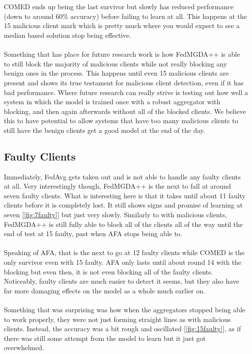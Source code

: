 \\ \\
COMED ends up being the last survivor but slowly has reduced performance (down to around 60\% accuracy) before failing to learn at all.
This happens at the 15 malicious client mark which is pretty much where you would expect to see a median based solution stop being effective.
\\ \\
Something that has place for future research work is how FedMGDA++ is able to still block the majority of malicious clients while not really blocking any benign ones in the process.
This happens until even 15 malicious clients are present and shows its true testament for malicious client detection, even if it has bad performance.
Where future research can really strive is testing out how well a system in which the model is trained once with a robust aggregator with blocking, and then again afterwards without all of the blocked clients.
We believe this to have potential to allow systems that have too many malicious clients to still have the benign clients get a good model at the end of the day.


\subsection{Faulty Clients}
Immediately, FedAvg gets taken out and is not able to handle any faulty clients at all.
Very interestingly though, FedMGDA++ is the next to fall at around seven faulty clients.
What is interesting here is that it takes until about 11 faulty clients before it is completely lost.
It still shows signs and promise of learning at seven [\ref{fig:7faulty}] but just very slowly.
Similarly to with malicious clients, FedMGDA++ is still fully able to block all of the clients all of the way until the end of test at 15 faulty, past when AFA stops being able to.
\\ \\
Speaking of AFA, that is the next to go at 12 faulty clients while COMED is the only survivor even with 15 faulty.
AFA only lasts until about round 14 with the blocking but even then, it is not even blocking all of the faulty clients.
Noticeably, faulty clients are much easier to detect it seems, but they also have far more damaging effects on the model as a whole much earlier on.
\\ \\
Something that was surprising was how when the aggregators stopped being able to work properly, they were not just forming straight lines as with malicious clients.
Instead, the accuracy was a bit rough and oscillated [\ref{fig:15faulty}], as if there was still some attempt from the model to learn but it just got overwhelmed.


